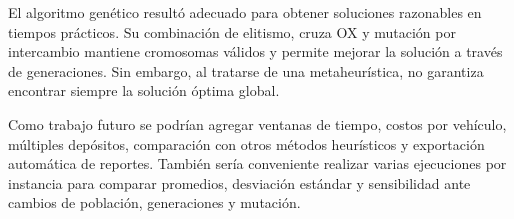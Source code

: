 \documentclass[runningheads]{llncs}
\begin{document}
El algoritmo genético resultó adecuado para obtener soluciones razonables en tiempos prácticos. Su combinación de elitismo, cruza OX y mutación por intercambio mantiene cromosomas válidos y permite mejorar la solución a través de generaciones. Sin embargo, al tratarse de una metaheurística, no garantiza encontrar siempre la solución óptima global.

Como trabajo futuro se podrían agregar ventanas de tiempo, costos por vehículo, múltiples depósitos, comparación con otros métodos heurísticos y exportación automática de reportes. También sería conveniente realizar varias ejecuciones por instancia para comparar promedios, desviación estándar y sensibilidad ante cambios de población, generaciones y mutación.



\end{document}
